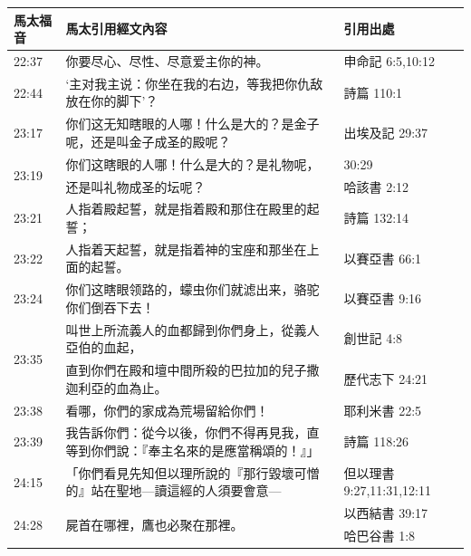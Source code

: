 \begin{table}[htbp]
  \centering

    \begin{tabular}{|p{4.2em}|p{31.645em}|p{7.3em}|}
    \toprule
    \rowcolor[rgb]{ .749,  .749,  .749} \textcolor[rgb]{ .267,  .447,  .769}{\textbf{馬太福音}} 
    & \textcolor[rgb]{ .267,  .447,  .769}{\textbf{馬太引用經文內容}} 
    & \textcolor[rgb]{ .267,  .447,  .769}{\textbf{引用出處}} \\
    \midrule
    22:37 & 你要尽心、尽性、尽意爱主你的神。 & 申命記 6:5,10:12 \\
    \midrule
    22:44 & ‘主对我主说：你坐在我的右边，等我把你仇敌放在你的脚下’？ & 詩篇 110:1 \\
    \midrule
    23:17 & 你们这无知瞎眼的人哪！什么是大的？是金子呢，还是叫金子成圣的殿呢？ & 出埃及記 29:37\\
    \multirow{2}[3]{*}{23:19} & 你们这瞎眼的人哪！什么是大的？是礼物呢， & 30:29   \\
\cmidrule{3-3}    \multicolumn{1}{|l|}{} & 还是叫礼物成圣的坛呢？ & 哈該書 2:12 \\
    \midrule
    23:21 & 人指着殿起誓，就是指着殿和那住在殿里的起誓； & 詩篇 132:14 \\
    \midrule
    23:22 & 人指着天起誓，就是指着神的宝座和那坐在上面的起誓。 & 以賽亞書 66:1 \\
    \midrule
    23:24 & 你们这瞎眼领路的，蠓虫你们就滤出来，骆驼你们倒吞下去！ & 以賽亞書 9:16 \\
    \midrule
    \multirow{2}[4]{*}{23:35} & 叫世上所流義人的血都歸到你們身上，從義人亞伯的血起， & 創世記 4:8 \\
\cmidrule{3-3}    \multicolumn{1}{|l|}{} & 直到你們在殿和壇中間所殺的巴拉加的兒子撒迦利亞的血為止。 & 歷代志下 24:21 \\
    \midrule
    23:38 & 看哪，你們的家成為荒場留給你們！ & 耶利米書 22:5 \\
    \midrule
    23:39 & 我告訴你們：從今以後，你們不得再見我，直等到你們說：『奉主名來的是應當稱頌的！』」 & \multicolumn{1}{l|}{詩篇 118:26} \\
    \midrule
    24:15 & 「你們看見先知但以理所說的『那行毀壞可憎的』站在聖地—讀這經的人須要會意— & 但以理書 9:27,11:31,12:11 \\
    \midrule
    \multirow{2}[4]{*}{24:28} & \multirow{2}[4]{*}{屍首在哪裡，鷹也必聚在那裡。} & 以西結書 39:17 \\
\cmidrule{3-3}    \multicolumn{1}{|l|}{} & \multicolumn{1}{l|}{} & 哈巴谷書 1:8 \\

\end{tabular}
\end{table}

